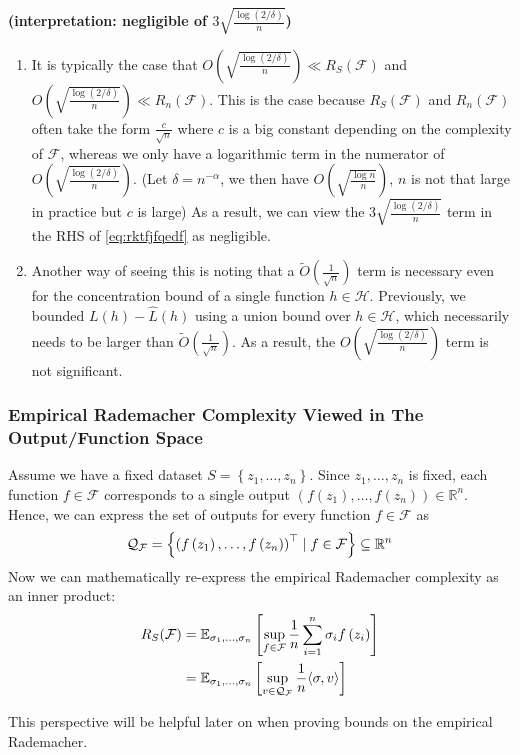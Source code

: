 \documentclass{article}
\newcommand{\bfs}[1]{\textbf{({#1}) }}
\begin{document}
\begin{rema}\bfs{interpretation: negligible of $3 \sqrt{\frac{\log (2 / \delta)}{n}}$}
\begin{enumerate}
    \item It is typically the case that $O\left(\sqrt{\frac{\log (2 / \delta)}{n}}\right) \ll R_{S}(\mathcal{F})$ and $O\left(\sqrt{\frac{\log (2 / \delta)}{n}}\right) \ll R_{n}(\mathcal{F}) .$ This is the case because $R_{S}(\mathcal{F})$ and $R_{n}(\mathcal{F})$ often take the form $\frac{c}{\sqrt{n}}$ where $c$ is a big constant depending on the complexity of $\mathcal{F}$, whereas we only have a logarithmic term in the numerator of $O\left(\sqrt{\frac{\log (2 / \delta)}{n}}\right) .$ (Let $\delta=n^{-\alpha}$, we then have $O\left(\sqrt{\frac{\log n}{n}}\right)$, $n$ is not that large in practice but $c$ is large)
    As a result, we can view the $3 \sqrt{\frac{\log (2 / \delta)}{n}}$ term in the RHS of \cref{eq:rktfjfqedf} as negligible. 
    \item Another way of seeing this is noting that a $\widetilde{O}\left(\frac{1}{\sqrt{n}}\right)$ term is necessary even for the concentration bound of a single function $h \in \mathcal{H} .$ Previously, we bounded $L(h)-\hat{L}(h)$ using a union bound over $h \in \mathcal{H}$, which necessarily needs to be larger than $\widetilde{O}\left(\frac{1}{\sqrt{n}}\right) .$ As a result, the $O\left(\sqrt{\frac{\log (2 / \delta)}{n}}\right)$ term is not significant.
\end{enumerate}
\end{rema}  
\subsubsection{Empirical Rademacher Complexity Viewed in The Output/Function Space}\label{sssect:empri_rad_com}
Assume we have a fixed dataset $S=\left\{z_{1}, \ldots, z_{n}\right\} .$ Since $z_{1}, \ldots, z_{n}$ is fixed, each function $f \in \mathcal{F}$ corresponds to a single output $\left(f\left(z_{1}\right), \ldots, f\left(z_{n}\right)\right) \in \mathbb{R}^{n} .$ Hence, we can express the set of outputs for every function $f \in \mathcal{F}$ as
\begin{align*}
\mathcal{Q}_{\mathcal{F}}=\left\{\left(f\left(z_{1}\right), \ldots, f\left(z_{n}\right)\right)^\top \mid f \in \mathcal{F}\right\}\subseteq \mathbb{R}^n
\end{align*}
Now we can mathematically re-express the empirical Rademacher complexity as an inner product:
\begin{align*}
\begin{aligned}
R_{S}(\mathcal{F}) &=\mathbb{E}_{\sigma_{1}, \ldots, \sigma_{n}}\left[\sup _{f \in \mathcal{F}} \frac{1}{n} \sum_{i=1}^{n} \sigma_{i} f\left(z_{i}\right)\right] \\
&=\mathbb{E}_{\sigma_{1}, \ldots, \sigma_{n}}\left[\sup _{v \in \mathcal{Q}_{\mathcal{F}}} \frac{1}{n}\langle\sigma, v\rangle\right]
\end{aligned}
\end{align*}
\begin{rema}
This perspective will be helpful later on when proving bounds on the empirical Rademacher.
\end{rema}
\end{document}

